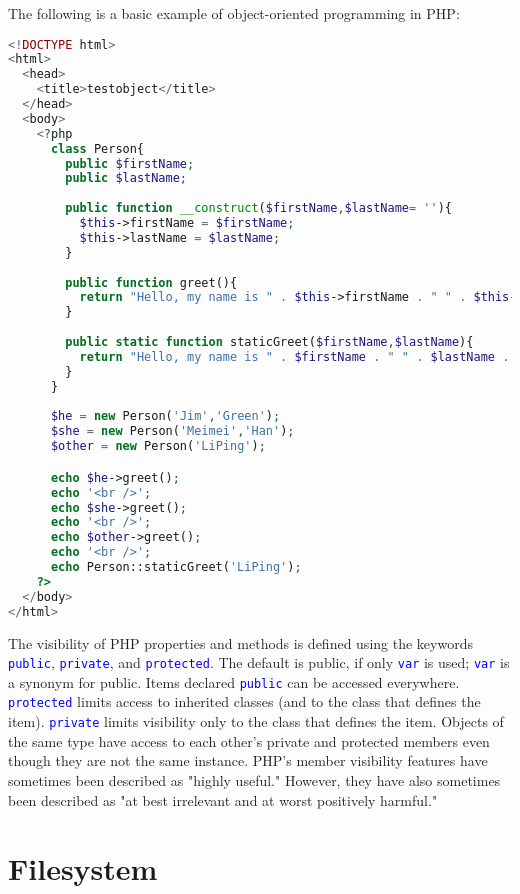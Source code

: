 The following is a basic example of object-oriented programming in PHP:

\begin{lstlisting}[language=PHP]
<!DOCTYPE html>
<html>
  <head>
    <title>testobject</title>
  </head>
  <body>
    <?php
      class Person{
        public $firstName;
        public $lastName;
        
        public function __construct($firstName,$lastName= ''){
          $this->firstName = $firstName;
          $this->lastName = $lastName;
        }
        
        public function greet(){
          return "Hello, my name is " . $this->firstName . " " . $this->lastName . ".";
        }
        
        public static function staticGreet($firstName,$lastName){
          return "Hello, my name is " . $firstName . " " . $lastName . "."; 
        }
      }
      
      $he = new Person('Jim','Green');
      $she = new Person('Meimei','Han');
      $other = new Person('LiPing');

      echo $he->greet();
      echo '<br />';
      echo $she->greet();
      echo '<br />';
      echo $other->greet();
      echo '<br />';
      echo Person::staticGreet('LiPing');
    ?>
  </body>
</html>
\end{lstlisting}

The visibility of PHP properties and methods is defined using the keywords \textcolor{Blue}{\texttt{public}}, \textcolor{Blue}{\texttt{private}}, and \textcolor{Blue}{\texttt{protected}}. The default is public, if only \textcolor{Blue}{\texttt{var}} is used; \textcolor{Blue}{\texttt{var}} is a synonym for public. Items declared \textcolor{Blue}{\texttt{public}} can be accessed everywhere. \textcolor{Blue}{\texttt{protected}} limits access to inherited classes (and to the class that defines the item). \textcolor{Blue}{\texttt{private}} limits visibility only to the class that defines the item. Objects of the same type have access to each other's private and protected members even though they are not the same instance. PHP's member visibility features have sometimes been described as "highly useful." However, they have also sometimes been described as "at best irrelevant and at worst positively harmful."

\chapter{Filesystem}




